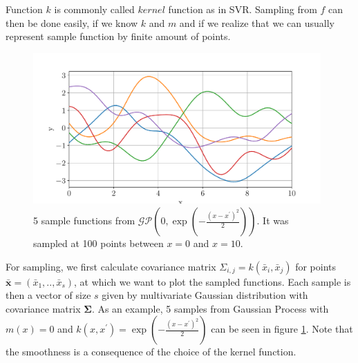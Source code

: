 Function $k$ is commonly called $kernel$ function as in SVR. Sampling from $f$ can then be done easily, if we know $k$ and $m$ and if we realize that we can usually represent sample function by finite amount of points. 

\begin{figure}[ht]
	\centering
	\includegraphics[width=0.98\textwidth]{figures/gaussian-samples}
	\caption{5 sample functions from $\mathcal{GP}(0,\exp(-\frac{(x-x^\prime)^2}{2}))$. It was sampled at 100 points between $x = 0$ and $x=10$.}
	\label{fig:gaussian-samples}
\end{figure}

For sampling, we first calculate covariance matrix $\Sigma_{i,j} = k(\bar{x}_i,\bar{x}_j)$ for points $\bm{\bar{x}} = (\bar{x}_1,.. ,\bar{x}_s)$, at which we want to plot the sampled functions. Each sample is then a vector of size $s$ given by multivariate Gaussian distribution with covariance matrix $\bm{\Sigma}$. As an example, 5 samples from Gaussian Process with $m(x) = 0$ and $k(x,x^\prime) = \exp(-\frac{(x-x^\prime)^2}{2})$ can be seen in figure \ref{fig:gaussian-samples}. Note that the smoothness is a consequence of the choice of the kernel function.

